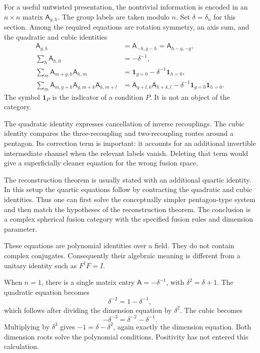 For a useful untwisted presentation, the nontrivial information is
encoded in an $n\times n$ matrix $\mathsf A_{g,h}$.  The group
labels are taken modulo $n$.  Set $\delta=\delta_n$ for this
section.  Among the required equations are rotation symmetry,
an axis sum, and the quadratic and cubic identities
\begin{align}
 \mathsf A_{g,h}&=\mathsf A_{-h,g-h}
 =\mathsf A_{h-g,-g},\label{eq:HI-rotation}\\
 \sum_h\mathsf A_{h,0}&=-\delta^{-1},\label{eq:HI-axis-sum}\\
 \sum_m\mathsf A_{m+g,h}\mathsf A_{h,m}
 &=\mathbf1_{g=0}-\delta^{-1}\mathbf1_{h=0},
 \label{eq:HI-quadratic}\\
 \sum_m\mathsf A_{m,g+h}\mathsf A_{g,m+k}\mathsf A_{h,m+l}
 &=\mathsf A_{g+l,k}\mathsf A_{h+k,l}
 -\delta^{-1}\mathbf1_{g=0}\mathbf1_{h=0}.
 \label{eq:HI-cubic}
\end{align}
The symbol $\mathbf1_P$ is the indicator of a condition $P$.
It is not an object of the category.

The quadratic identity expresses cancellation of inverse
recouplings.  The cubic identity compares the three-recoupling
and two-recoupling routes around a pentagon.  Its correction term
is important: it accounts for an additional invertible intermediate
channel when the relevant labels vanish.  Deleting that term would
give a superficially cleaner equation for the wrong fusion space.

The reconstruction theorem is usually stated with an additional
quartic identity.  In this setup the quartic equations follow by
contracting the quadratic and cubic identities.  Thus one can first
solve the conceptually simpler pentagon-type system and then match
the hypotheses of the reconstruction theorem.  The conclusion is
a complex spherical fusion category with the specified fusion
rules and dimension parameter.

These equations are polynomial identities over a field.  They do
not contain complex conjugates.  Consequently their algebraic
meaning is different from a unitary identity such as
$F^\dagger F=I$.

\begin{example}
When $n=1$, there is a single matrix entry
$\mathsf A=-\delta^{-1}$, with $\delta^2=\delta+1$.
The quadratic equation becomes
\[
 \delta^{-2}=1-\delta^{-1},
\]
which follows after dividing the dimension equation by $\delta^2$.
The cubic becomes
\[
 -\delta^{-3}=\delta^{-2}-\delta^{-1}.
\]
Multiplying by $\delta^3$ gives $-1=\delta-\delta^2$,
again exactly the dimension equation.  Both dimension roots solve
the polynomial conditions.  Positivity has not entered this
calculation.
\end{example}

